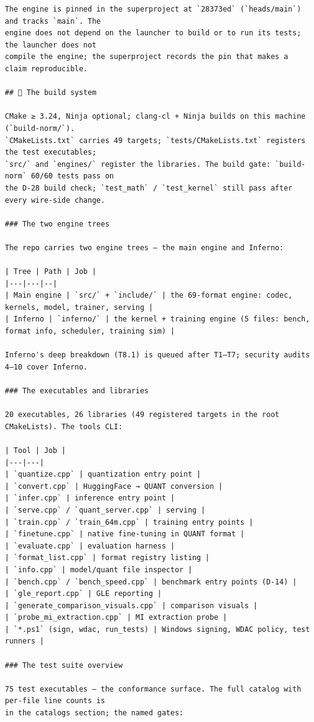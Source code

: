 \begin{Verbatim}[breaklines,breakanywhere,fontsize=\footnotesize]
The engine is pinned in the superproject at `28373ed` (`heads/main`) and tracks `main`. The
engine does not depend on the launcher to build or to run its tests; the launcher does not
compile the engine; the superproject records the pin that makes a claim reproducible.

## 🔨 The build system

CMake ≥ 3.24, Ninja optional; clang-cl + Ninja builds on this machine (`build-norm/`).
`CMakeLists.txt` carries 49 targets; `tests/CMakeLists.txt` registers the test executables;
`src/` and `engines/` register the libraries. The build gate: `build-norm` 60/60 tests pass on
the D-28 build check; `test_math` / `test_kernel` still pass after every wire-side change.

### The two engine trees

The repo carries two engine trees — the main engine and Inferno:

| Tree | Path | Job |
|---|---|--|
| Main engine | `src/` + `include/` | the 69-format engine: codec, kernels, model, trainer, serving |
| Inferno | `inferno/` | the kernel + training engine (5 files: bench, format info, scheduler, training sim) |

Inferno's deep breakdown (T8.1) is queued after T1–T7; security audits 4–10 cover Inferno.

### The executables and libraries

20 executables, 26 libraries (49 registered targets in the root CMakeLists). The tools CLI:

| Tool | Job |
|---|---|
| `quantize.cpp` | quantization entry point |
| `convert.cpp` | HuggingFace → QUANT conversion |
| `infer.cpp` | inference entry point |
| `serve.cpp` / `quant_server.cpp` | serving |
| `train.cpp` / `train_64m.cpp` | training entry points |
| `finetune.cpp` | native fine-tuning in QUANT format |
| `evaluate.cpp` | evaluation harness |
| `format_list.cpp` | format registry listing |
| `info.cpp` | model/quant file inspector |
| `bench.cpp` / `bench_speed.cpp` | benchmark entry points (D-14) |
| `gle_report.cpp` | GLE reporting |
| `generate_comparison_visuals.cpp` | comparison visuals |
| `probe_mi_extraction.cpp` | MI extraction probe |
| `*.ps1` (sign, wdac, run_tests) | Windows signing, WDAC policy, test runners |

### The test suite overview

75 test executables — the conformance surface. The full catalog with per-file line counts is
in the catalogs section; the named gates:


\end{Verbatim}

